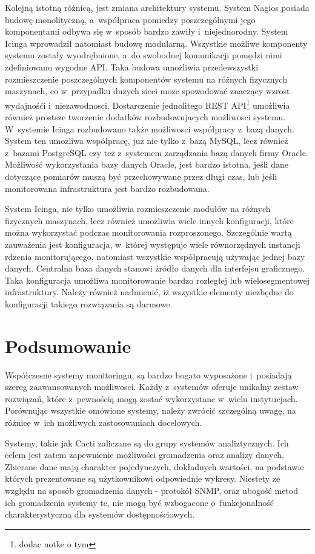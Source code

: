 Kolejną istotną różnicą, jest zmiana architektury systemu. System
Nagios posiada budowę monolityczną, a~współpraca pomiedzy
poszczególnymi jego komponentami odbywa się w~sposób bardzo zawiły
i~niejednorodny. System Icinga wprowadził natomiast budowę
modularną. Wszystkie możliwe komponenty systemu zostały wyodrębnione,
a~do swobodnej komunikacji pomędzi nimi zdefiniowano wygodne API. Taka
budowa umożliwia przedewszystki rozmieszczenie poszczególnych
komponentów systemu na różnych fizycznych maszynach, co w~przypadku
duzych sieci moze spowodować znaczący wzrost wydajnośći
i~niezawodnosci. Dostarczenie jednolitego REST API\footnote{dodac
  notke o tym} umożliwia również prostsze tworzenie dodatków
rozbudowujacych możliwosci systemu.  W~systemie Icinga rozbudowano
także możliwosci współpracy z~bazą danych. System ten umożliwa
współpracę, już nie tylko z~bazą MySQL, lecz również z~bazami
PostgreSQL czy też z~systemem zarządzania bazą danych firmy
Oracle. Możliwość wykorzystania bazy danych Oracle, jest bardzo
istotna, jeśli dane dotyczące pomiarów muszą być przechowywane przez
długi czas, lub jeśli monitorowana infrastruktura jest bardzo
rozbudowana.

System Icinga, nie tylko umożliwia rozmieszczenie modułów na różnych
fizycznych maszynach, lecz również umożliwia wiele innych
konfiguracji, które można wykorzystać podczas monitorowania
rozproszonego. Szczególnie wartą zauważenia jest konfiguracja,
w~której występuje wiele równorzędnych instancji rdzenia
monitorującego, natomiast wszystkie współpracują używając jednej bazy
danych. Centralna baza danych stanowi źródło danych dla interfejsu
graficznego. Taka konfiguracja umożliwa monitorowanie bardzo rozległej
lub wielosegmentowej infrastruktury. Należy również nadmienić, iż
wszystkie elementy niezbędne do konfiguracji takiego rozwiązania są
darmowe.

\section[Podsumowanie][Podsumowanie]{Podsumowanie}

Współczesne systemy monitoringu, są bardzo bogato wyposażone
i~posiadają szereg zaawansowanych możliwosci. Każdy z~systemów oferuje
unikalny zestaw rozwiązań, które z~pewnością mogą zostać wykorzystane
w~wielu instytucjach. Porównując wszystkie omówione systemy, należy
zwrócić szczególną uwagę, na różnice w~ich możliwych zastosowaniach
docelowych.

Systemy, takie jak Cacti zaliczane są do grupy systemów
analiztycznych. Ich celem jest zatem zapewnienie możliwości
gromadzenia oraz analizy danych. Zbierane dane mają charakter
pojedynczych, dokładnych wartości, na podstawie których prezentowane
są użytkownikowi odpowiednie wykresy. Niestety ze względu na sposób
gromadzenia danych - protokół SNMP, oraz ubogość metod ich gromadzenia
systemy te, nie mogą być wzbogacone o~funkcjonalność charakterystyczną
dla systemów dostępnościowych.

